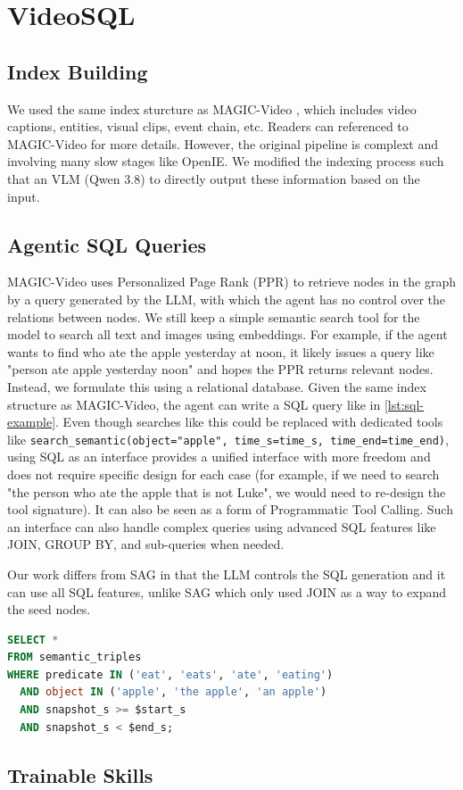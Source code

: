 \section{VideoSQL}

\subsection{Index Building}
We used the same index sturcture as MAGIC-Video \cite{li_bridging_2026}, which includes video captions, entities, visual clips, event chain, etc. Readers can referenced to MAGIC-Video for more details. However, the original pipeline is complext and involving many slow stages like OpenIE. We modified the indexing process such that an VLM (Qwen 3.8) to directly output these information based on the input.

\subsection{Agentic SQL Queries}
MAGIC-Video uses Personalized Page Rank (PPR) to retrieve nodes in the graph by a query generated by the LLM, with which the agent has no control over the relations between nodes. We still keep a simple semantic search tool for the model to search all text and images using embeddings. For example, if the agent wants to find who ate the apple yesterday at noon, it likely issues a query like "person ate apple yesterday noon" and hopes the PPR returns relevant nodes. Instead, we formulate this using a relational database. Given the same index structure as MAGIC-Video, the agent can write a SQL query like in \cref{lst:sql-example}. Even though searches like this could be replaced with dedicated tools like \texttt{search\_semantic(object="apple", time\_s=time\_s, time\_end=time\_end)}, using SQL as an interface provides a unified interface with more freedom and does not require specific design for each case (for example, if we need to search "the person who ate the apple that is not Luke", we would need to re-design the tool signature). It can also be seen as a form of Programmatic Tool Calling. Such an interface can also handle complex queries using advanced SQL features like JOIN, GROUP BY, and sub-queries when needed.

Our work differs from SAG \cite{wu_sag_2026} in that the LLM controls the SQL generation and it can use all SQL features, unlike SAG which only used JOIN as a way to expand the seed nodes.

\begin{lstlisting}[language=SQL, caption={An example SQL query for finding who ate the apple within a given time window.}, label={lst:sql-example}]
SELECT *
FROM semantic_triples
WHERE predicate IN ('eat', 'eats', 'ate', 'eating')
  AND object IN ('apple', 'the apple', 'an apple')
  AND snapshot_s >= $start_s
  AND snapshot_s < $end_s;
\end{lstlisting}


\subsection{Trainable Skills}

